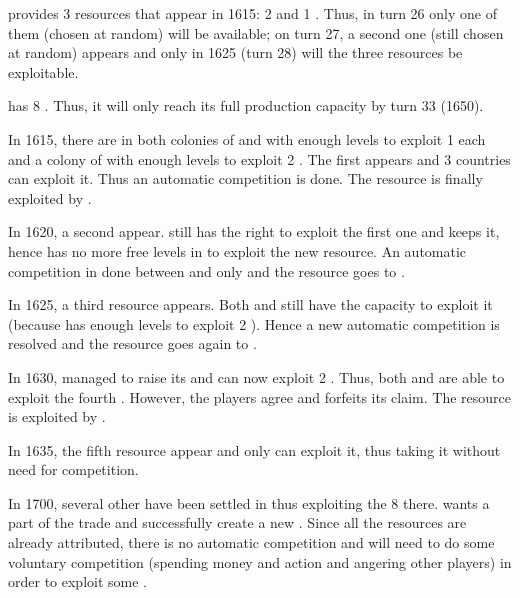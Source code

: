 \begin{exemple}
  \granderegionGuyana provides 3 resources that appear in 1615: 2 
  and 1 . Thus, in turn 26 only one of them (chosen at
  random) will be available; on turn 27, a second one (still chosen at random)
  appears and only in 1625 (turn 28) will the three resources be exploitable.

  \granderegionAntilles has 8 . Thus, it will only reach its full
  production capacity by turn 33 (1650).

  In 1615, there are in \granderegionAntilles both colonies of \FRA and \ANG
  with enough levels to exploit 1  each and a colony of \HOL with
  enough levels to exploit 2 . The first  appears and 3
  countries can exploit it. Thus an automatic competition is done. The
  resource is finally exploited by \FRA.

  In 1620, a second  appear. \FRA still has the right to exploit
  the first one and keeps it, hence \FRA has no more free levels in
  \granderegionAntilles to exploit the new resource. An automatic competition
  in done between \ANG and \HOL only and the resource goes to \HOL.

  In 1625, a third resource appears. Both \ANG and \HOL still have the
  capacity to exploit it (because \HOL has enough levels to exploit 2
  ). Hence a new automatic competition is resolved and the resource
  goes again to \HOL.

  In 1630, \FRA managed to raise its \COL and can now exploit 2
  . Thus, both \FRA and \ANG are able to exploit the fourth
  . However, the players agree and \FRA forfeits its claim. The
  resource is exploited by \ANG.

  In 1635, the fifth resource appear and only \FRA can exploit it, thus taking
  it without need for competition.

  In 1700, several other \COL have been settled in \granderegionAntilles thus
  exploiting the 8  there. \HIS wants a part of the trade and
  successfully create a new \COL. Since all the resources are already
  attributed, there is no automatic competition and \HIS will need to do some
  voluntary competition (spending money and action and angering other players)
  in order to exploit some .
\end{exemple}

